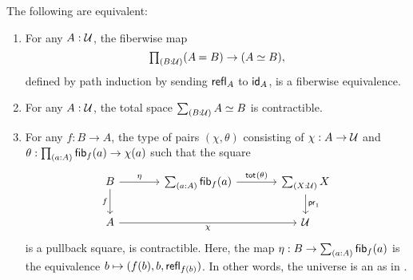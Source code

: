 \documentclass[reqno]{amsart}
\begin{document}
\begin{thm}\label{thm:univalence}
The following are equivalent:
\begin{enumerate}
\item \textup{} For any $A:\UU$, the fiberwise map
\begin{equation*}
\prd{B:\UU} (\id{A}{B})\to(\eqv{A}{B}),
\end{equation*}
defined by path induction by sending $\refl{A}$ to $\idfunc[A]$, is a fiberwise equivalence.
\item For any $A:\UU$, the total space $\sm{B:\UU}\eqv{A}{B}$ is contractible.
\item For any $f:B\to A$, the type of pairs $(\chi,\theta)$ consisting of $\chi:A\to\UU$ and $\theta : \prd{a:A} \fib{f}{a}\to \chi(a)$ such that the square
\begin{equation*}
\begin{tikzcd}[column sep=large]
B \arrow[r,"\eta"] \arrow[d,swap,"f"] & \sm{a:A}\fib{f}{a} \arrow[r,"\total{\theta}"] & \sm{X:\UU} X \arrow[d,"\proj1"] \\
A \arrow[rr,swap,"\chi"] & & \UU
\end{tikzcd}
\end{equation*}
is a pullback square, is contractible. Here, the map $\eta:B\to\sm{a:A}\fib{f}{a}$ is the equivalence $b\mapsto\pairr{f(b),b,\refl{f(b)}}$. In other words, the universe is an  as in \cite{Lurie09}.
\begin{comment}
\item \textup{\define{The descent property.}} For any parallel pair $f,g:B\to A$ of maps with homotopy coequalizer $c:A\to C_{f,g}$ and $H:c\circ f \htpy c\circ g$, the map
\begin{equation*}
(C_{f,g}\to\UU)\to\Big(\sm{P:A\to\UU}\prd{b:B}\eqv{P(f(b))}{P(g(b))}\Big)
\end{equation*}
defined by taking $Q:C_{f,g}\to\UU$ to the pair $\pairr{P,e}$, where $P$ and $e$ are
given by
\begin{align*}
P(a) & \defeq Q(c(a))\\
e(b) & \defeq \transfibf{Q}(H(b)),
\end{align*}
is an equivalence.
\end{comment}
\end{enumerate}
\end{thm} 
\end{document}
